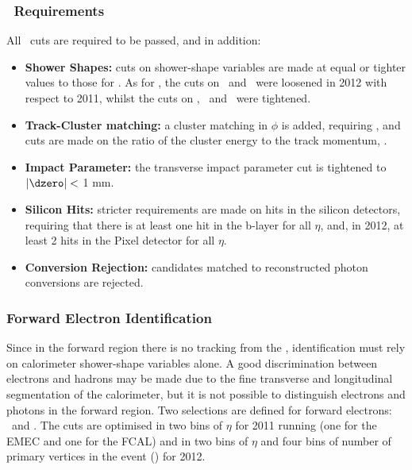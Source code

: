 \subsubsection{\tightPP\ Requirements}


All \mediumPP\ cuts are required to be passed, and in addition:

\begin{itemize}
    \item {\bf Shower Shapes:} cuts on shower-shape variables are made at equal
    or tighter values to those for \mediumPP. As for \mediumPP,
    the cuts on \Reta\ and \Rhad\ were loosened in 2012 with respect to 2011, 
    whilst the cuts on  \wetatwo, \Eratio\ and
    \wstot\ were tightened.

    \item {\bf Track-Cluster matching:} a cluster matching in $\phi$ is added,
    requiring , and cuts are made on the ratio of the cluster
    energy to the track momentum, \Eoverp.

    \item {\bf Impact Parameter:} the
    transverse impact parameter cut is tightened to $|\dzero| <$ 1 mm.

    \item {\bf Silicon Hits:} stricter requirements are made on hits in the
    silicon detectors, requiring that there is at least one hit in the b-layer for
    all $\eta$, and, in 2012, at least 2 hits in the Pixel detector for all
    $\eta$.

    \item {\bf Conversion Rejection:} candidates matched to reconstructed photon
    conversions are rejected.

\end{itemize}

\subsubsection{Forward Electron Identification}

Since in the forward region there is no tracking from the \id,
identification must rely on calorimeter shower-shape
variables alone. A good discrimination between electrons and hadrons may be made
due to the fine transverse and longitudinal segmentation of the calorimeter, but
it is not possible to distinguish electrons and photons in the forward region.
Two selections are defined for forward electrons: \loose\ and \tight. The cuts
are optimised in two bins of $\eta$ for 2011 running (one for the EMEC and one
for the FCAL) and in two bins of $\eta$ and four bins of number of primary
vertices in the event (\nPV) for 2012.

